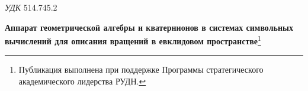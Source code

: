 \begin{flushleft}
{\em УДК} 514.745.2
\end{flushleft}
\begin{center}
\textbf{Аппарат геометрической алгебры и кватернионов в системах символьных вычислений для описания вращений в евклидовом пространстве}\footnote{Публикация выполнена при поддержке Программы стратегического
академического лидерства РУДН.}
\end{center}
